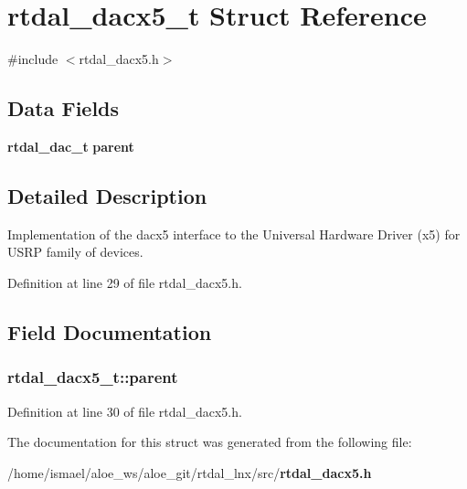 \section{rtdal\-\_\-dacx5\-\_\-t Struct Reference}
\label{structrtdal__dacx5__t}


{\ttfamily \#include $<$rtdal\-\_\-dacx5.\-h$>$}

\subsection*{Data Fields}
\begin{DoxyCompactItemize}
\item 
{\bf rtdal\-\_\-dac\-\_\-t} {\bf parent}
\end{DoxyCompactItemize}


\subsection{Detailed Description}
Implementation of the dacx5 interface to the Universal Hardware Driver (x5) for U\-S\-R\-P family of devices. 

Definition at line 29 of file rtdal\-\_\-dacx5.\-h.



\subsection{Field Documentation}
\subsubsection[{parent}]{ rtdal\-\_\-dacx5\-\_\-t\-::parent}\label{structrtdal__dacx5__t_ae6fa4c012185aa153ef2898fbdcfe3ee}


Definition at line 30 of file rtdal\-\_\-dacx5.\-h.



The documentation for this struct was generated from the following file\-:\begin{DoxyCompactItemize}
\item 
/home/ismael/aloe\-\_\-ws/aloe\-\_\-git/rtdal\-\_\-lnx/src/{\bf rtdal\-\_\-dacx5.\-h}\end{DoxyCompactItemize}
